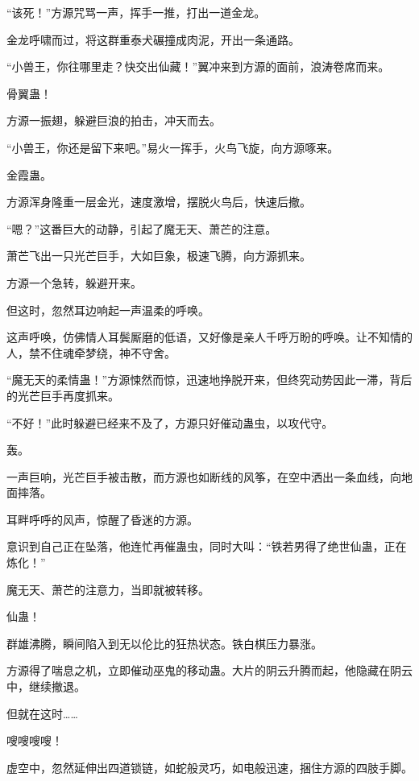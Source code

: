 
\begin{this_body}



“该死！”方源咒骂一声，挥手一推，打出一道金龙。

金龙呼啸而过，将这群重泰犬碾撞成肉泥，开出一条通路。

“小兽王，你往哪里走？快交出仙藏！”翼冲来到方源的面前，浪涛卷席而来。

骨翼蛊！

方源一振翅，躲避巨浪的拍击，冲天而去。

“小兽王，你还是留下来吧。”易火一挥手，火鸟飞旋，向方源啄来。

金霞蛊。

方源浑身隆重一层金光，速度激增，摆脱火鸟后，快速后撤。

“嗯？”这番巨大的动静，引起了魔无天、萧芒的注意。

萧芒飞出一只光芒巨手，大如巨象，极速飞腾，向方源抓来。

方源一个急转，躲避开来。

但这时，忽然耳边响起一声温柔的呼唤。

这声呼唤，仿佛情人耳鬓厮磨的低语，又好像是亲人千呼万盼的呼唤。让不知情的人，禁不住魂牵梦绕，神不守舍。

“魔无天的柔情蛊！”方源悚然而惊，迅速地挣脱开来，但终究动势因此一滞，背后的光芒巨手再度抓来。

“不好！”此时躲避已经来不及了，方源只好催动蛊虫，以攻代守。

轰。

一声巨响，光芒巨手被击散，而方源也如断线的风筝，在空中洒出一条血线，向地面摔落。

耳畔呼呼的风声，惊醒了昏迷的方源。

意识到自己正在坠落，他连忙再催蛊虫，同时大叫：“铁若男得了绝世仙蛊，正在炼化！”

魔无天、萧芒的注意力，当即就被转移。

仙蛊！

群雄沸腾，瞬间陷入到无以伦比的狂热状态。铁白棋压力暴涨。

方源得了喘息之机，立即催动巫鬼的移动蛊。大片的阴云升腾而起，他隐藏在阴云中，继续撤退。

但就在这时……

嗖嗖嗖嗖！

虚空中，忽然延伸出四道锁链，如蛇般灵巧，如电般迅速，捆住方源的四肢手脚。


\end{this_body}
